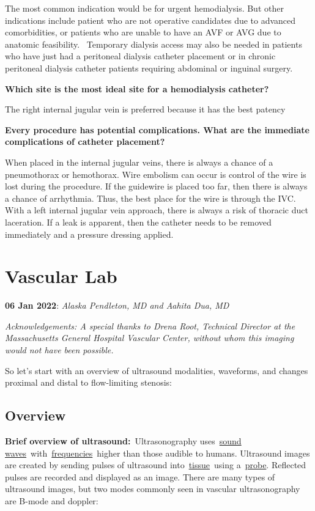 \documentclass[
]{book}
\begin{document}
The most common indication would be for urgent hemodialysis. But other
indications include patient who are not operative candidates due to
advanced comorbidities, or patients who are unable to have an AVF or AVG
due to anatomic feasibility.~ Temporary dialysis access may also be
needed in patients who have just had a peritoneal dialysis catheter
placement or in chronic peritoneal dialysis catheter patients requiring
abdominal or inguinal surgery.

\textbf{Which site is the most ideal site for a hemodialysis catheter?}

The right internal jugular vein is preferred because it has the best
patency

\textbf{Every procedure has potential complications. What are the immediate
complications of catheter placement?}

When placed in the internal jugular veins, there is always a chance of a
pneumothorax or hemothorax. Wire embolism can occur is control of the
wire is lost during the procedure. If the guidewire is placed too far,
then there is always a chance of arrhythmia. Thus, the best place for
the wire is through the IVC. With a left internal jugular vein approach,
there is always a risk of thoracic duct laceration. If a leak is
apparent, then the catheter needs to be removed immediately and a
pressure dressing applied.

\hypertarget{vascular-lab}{%
\chapter{Vascular Lab}\label{vascular-lab}}

\textbf{06 Jan 2022}: \emph{Alaska Pendleton, MD and Aahita Dua, MD}

\emph{Acknowledgements: A special thanks to Drena Root, Technical Director at
the Massachusetts General Hospital Vascular Center, without whom this
imaging would not have been possible.}

So let's start with an overview of ultrasound modalities, waveforms, and
changes proximal and distal to flow-limiting stenosis:

\hypertarget{overview}{%
\section{\texorpdfstring{\textbf{Overview}}{Overview}}\label{overview}}

\textbf{Brief overview of ultrasound:}~Ultrasonography uses~\href{https://en.wikipedia.org/wiki/Sound_wave}{sound
waves}~with~\href{https://en.wikipedia.org/wiki/Frequency}{frequencies}~higher
than those audible to humans. Ultrasound images are created by sending
pulses of ultrasound
into~\href{https://en.wikipedia.org/wiki/Tissue_(biology)}{tissue}~using
a~\href{https://en.wikipedia.org/wiki/Ultrasound_transducer\#Use_in_medicine}{probe}.
Reflected pulses are recorded and displayed as an image. There are many
types of ultrasound images, but two modes commonly seen in vascular
ultrasonography are B-mode and doppler:
\end{document}

